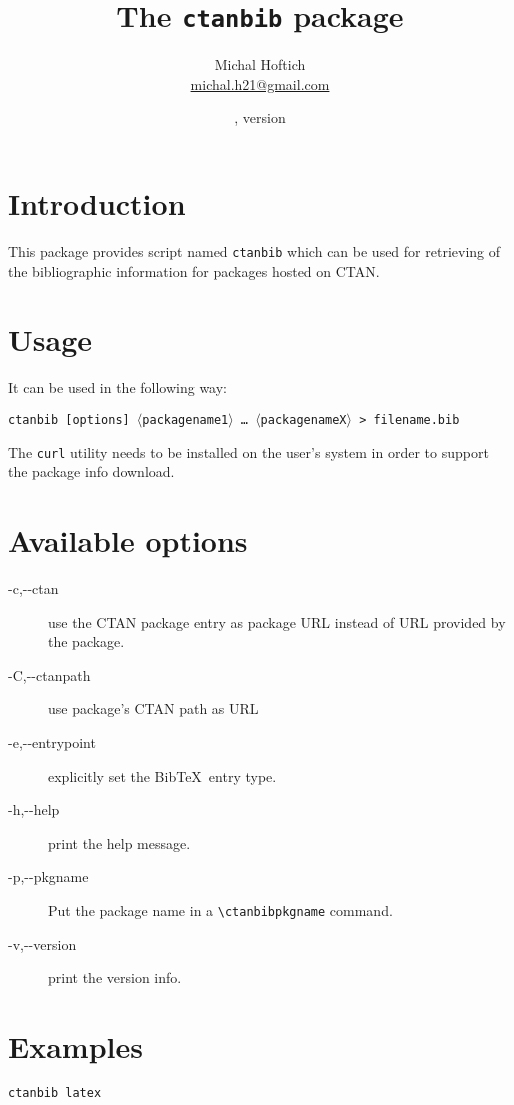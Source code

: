 \documentclass{ltxdoc}
\title{The \texttt{ctanbib} package}
\author{Michal Hoftich\\\href{mailto:michal.h21@gmail.com}{michal.h21@gmail.com}}
\date{\gitdate, version \gitversion}
\newcommand\package[1]{\texttt{#1}}
\begin{document}
\maketitle

\section{Introduction}
This package provides script named \package{ctanbib} which can be used for retrieving of the bibliographic information for packages hosted on CTAN.


\section{Usage}


It can be used in the following way:


\medskip

\noindent\package{ctanbib [options]  $\langle$packagename1$\rangle$ \ldots\ $\langle$packagenameX$\rangle$ > filename.bib}

\medskip

The \texttt{curl} utility needs to be installed on the user's system in order to support the package info download.


\section{Available options}

\begin{description}
  \item[-c,-\/-ctan] use the CTAN package entry as package URL instead of URL provided by the package.
  \item[-C,-\/-ctanpath]   use package's CTAN path as URL
  \item[-e,-\/-entrypoint] explicitly set the Bib\TeX\ entry type.
  \item[-h,-\/-help] print the help message.
  \item[-p,-\/-pkgname] Put the package name in a \verb|\ctanbibpkgname| command.
  \item[-v,-\/-version] print the version info.
\end{description}


\section{Examples}

\begin{verbatim}
ctanbib latex  
\end{verbatim}
\end{document}
